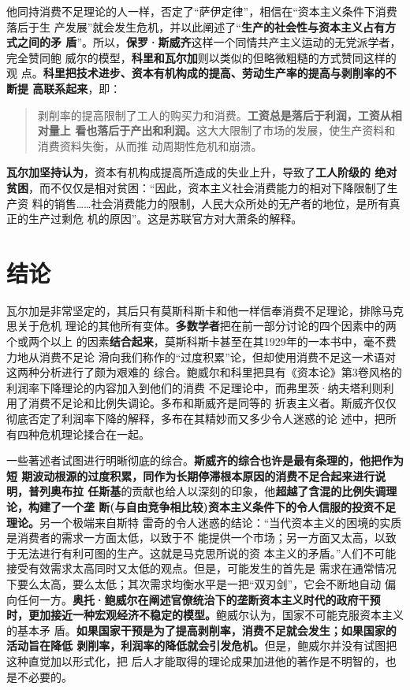他同持消费不足理论的人一样，否定了“萨伊定律”，相信在“资本主义条件下消费落后于生
产发展”就会发生危机，并以此阐述了“\textbf{生产的社会性与资本主义占有方式之间的矛
盾}”。所以，\textbf{保罗·斯威齐}这样一个同情共产主义运动的无党派学者，完全赞同鲍
威尔的模型，\textbf{科里和瓦尔加}则以类似的但略微粗糙的方式赞同这样的观
点。\textbf{科里把技术进步、资本有机构成的提高、劳动生产率的提高与剥削率的不断提
高联系起来}，即：
\begin{quotation}
剥削率的提高限制了工人的购买力和消费。\textbf{工资总是落后于利润，工资从相对量上
看也落后于产出和利润。}这大大限制了市场的发展，使生产资料和消费资料失衡，从而推
动周期性危机和崩溃。
\end{quotation}
\textbf{瓦尔加坚持认为}，资本有机构成提高所造成的失业上升，导致了\textbf{工人阶级的
绝对贫困}，而不仅仅是相对贫困：“因此，资本主义社会消费能力的相对下降限制了生产资
料的销售……社会消费能力的限制，人民大众所处的无产者的地位，是所有真正的生产过剩危
机的原因”。这是苏联官方对大萧条的解释。

\section{结论}

瓦尔加是非常坚定的，其后只有莫斯科斯卡和他一样信奉消费不足理论，排除马克思关于危机
理论的其他所有变体。\textbf{多数学者}把在前一部分讨论的四个因素中的两个或两个以上
的因素\textbf{结合起来}，莫斯科斯卡甚至在其1929年的一本书中，毫不费力地从消费不足论
滑向我们称作的“过度积累”论，但却使用消费不足这一术语对这两种分析进行了颇为艰难的
综合。鲍威尔和科里把具有《资本论》第3卷风格的利润率下降理论的内容加入到他们的消费
不足理论中，而弗里茨·纳夫塔利则利用了消费不足论和比例失调论。多布和斯威齐是同等的
折衷主义者。斯威齐仅仅彻底否定了利润率下降的解释，多布在其精妙而又多少令人迷惑的论
述中，把所有四种危机理论揉合在一起。

一些著述者试图进行明晰彻底的综合。\textbf{斯威齐的综合也许是最有条理的，他把作为短
期波动根源的过度积累，同作为长期停滞根本原因的消费不足合起来进行说明，普列奥布拉
任斯基}的贡献也给人以深刻的印象，他\textbf{超越了含混的比例失调理论，构建了一个垄
断(与自由竞争相比较)资本主义条件下的令人信服的投资不足理论。}另一个极端来自斯特
雷奇的令人迷惑的结论：“当代资本主义的困境的实质是消费者的需求一方面太低，以致于不
能提供一个市场；另一方面又太高，以致于无法进行有利可图的生产。这就是马克思所说的资
本主义的矛盾。”人们不可能接受有效需求太高同时又太低的观点。但是，可能发生的首先是
需求在通常情况下要么太高，要么太低；其次需求均衡水平是一把“双刃剑”，它会不断地自动
偏向任何一方。\textbf{奥托·鲍威尔在阐述官僚统治下的垄断资本主义时代的政府干预
时，更加接近一种宏观经济不稳定的模型。}鲍威尔认为，国家不可能克服资本主义的基本矛
盾。\textbf{如果国家干预是为了提高剥削率，消费不足就会发生；如果国家的活动旨在降低
剥削率，利润率的降低就会引发危机。}但是，鲍威尔并没有试图把这种直觉加以形式化，把
后人才能取得的理论成果加进他的著作是不明智的，也是不必要的。


